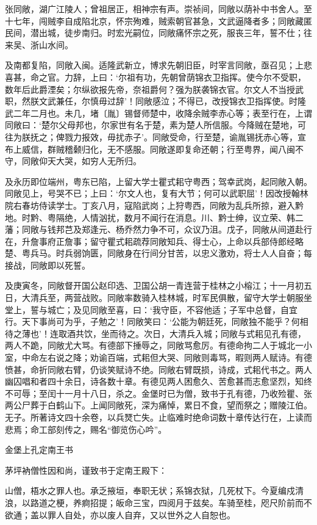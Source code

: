 \documentclass[]{article}
\begin{document}
张同敞，湖广江陵人；曾祖居正，相神宗有声。崇祯间，同敞以荫补中书舍人。至十七年，闯贼李自成陷北京，怀宗殉难，贼索朝官甚急，文武逼降者多；同敞藏匿民间，潜出城，徒步南归。时宏光嗣位，同敞痛怀宗之死，服丧三年，誓不仕；往来吴、浙山水间。

及南都复陷，同敞入闽。适隆武新立，博求先朝旧臣，时宰言同敞，亟召见；上悲喜甚，命之官。力辞，上曰：`尔祖有功，先朝曾荫锦衣卫指挥。使今尔不受职，数年后此爵湮矣；尔纵欲报先帝，奈祖爵何？强为朕袭锦衣官。尔文人不当授武职，然朕文武兼任，尔慎毋过辞'！同敞感泣；不得已，改授锦衣卫指挥使。时隆武二年二月也。未几，堵〔胤〕锡督师楚中，收降余贼李赤心等；表至行在，上谓同敞曰：`楚尔父母邦也，尔家世有名于楚，素为楚人所信服。今降贼在楚地，可往为朕抚之；俾戮力报效，毋扰赤子'。同敞受命，行至楚，谕胤锡抚赤心等，宣布上威信，群贼稽颡归化，无不感服。同敞遂即复命还朝；行至粤界，闻八闽不守，同敞仰天大哭，如穷人无所归。

及永历即位端州，粤东已陷，上留大学士瞿式耜守粤西；驾幸武岗，起同敞入朝。同敞见上，号哭不已；上曰：`尔文人也，复有大节；何可以武职屈'！因改授翰林院右春坊侍读学士。丁亥八月，寇陷武岗；上狩粤西，同敞为乱兵所掠，避入黔地。时黔、粤隔绝，人情汹扰，数月不闻行在消息。川、黔士绅，议立荣、韩二藩；同敞与钱邦芑及郑逢元、杨乔然力争不可，众议乃沮。戊子，同敞从间道赴行在，升詹事府正詹事；留守瞿式耜疏荐同敞知兵、得士心，上命以兵部侍郎经略楚、粤兵马。时兵弱饷匮，同敞身在行间分甘苦，以忠义激劝，将士人人自奋；每接战，同敞即以死誓。

及庚寅冬，同敞督开国公赵印选、卫国公胡一青连营于桂林之小榕江；十一月初五日，大清兵至，两营战败。同敞率数骑入桂林城，时军民俱散，留守大学士朝服坐堂上，誓与城亡；及见同敞至喜，曰：`我守臣，不容他适；子军中总督，自宜行。天下事尚可为乎，子勉之'！同敞笑曰：`公能为朝廷死，同敞独不能乎？何相待之薄也'！连取酒共饮，坐而待之。次日，大清兵入城；同敞与式耜见孔有德，两人不跪，同敞尤大骂。有德部下捶辱之，同敞骂愈厉。有德命拘二人于城北一小室，中命左右说之降；劝谕百端，式耜但大哭、同敞则毒骂，暇则两人赋诗。有德愤甚，命折同敞右臂，仍谈笑赋诗不绝。同敞右臂既损，诗成，式耜代书之。两人幽囚唱和者四十余日，诗各数十章。有德见两人困愈久、苦愈甚而志愈坚烈，知终不可辱；至闰十一月十八日，杀之。金堡时已为僧，致书于孔有德，乃收殓瞿、张两公尸葬于白鹤山下。上闻同敞死，深为痛悼，累日不食，望而祭之；赠陵江伯。无子。所著诗文四十余卷，以兵燹亡失。止临难时绝命词数十章传达行在，上读而悲焉；命工部刻传之，赐名``御览伤心吟''。

金堡上孔定南王书

茅坪衲僧性因和尚，谨致书于定南王殿下：

山僧，梧水之罪人也。承乏掖垣，奉职无状；系锦衣狱，几死杖下。今夏编戍清浪，以路道之梗，养痾招提；皈命三宝，四阅月于兹矣。车骑至桂，咫尺阶前而不欲通；盖以罪人自处，亦以废人自弃，又以世外之人自恕也。
\end{document}
